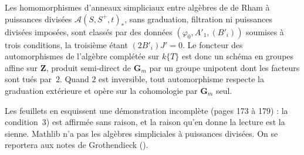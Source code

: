 \begin{encadre}
\begin{theoreme*}\nonverifie
Les homomorphismes d'anneaux simpliciaux entre algèbres de de Rham à puissances divisées $\mathcal A(S, S^+, t)_*$, sans graduation, filtration ni puissances divisées imposées, sont classés par des données $(\varphi_0, A'_1, (B'_i))$ soumises à trois conditions, la troisième étant $(2B'_i)J' = 0$. Le foncteur des automorphismes de l'algèbre complétée sur $k\{T\}$ est donc un schéma en groupes affine sur $\mathbf Z$, produit semi-direct de $\mathbf G_m$ par un groupe unipotent dont les facteurs sont tués par~$2$. Quand $2$ est inversible, tout automorphisme respecte la graduation extérieure et opère sur la cohomologie par $\mathbf G_m$ seul.
\end{theoreme*}
\end{encadre}
{\small Les feuillets en esquissent une démonstration incomplète (pages 173 à 179) : la condition~3) est affirmée sans raison, et la raison qu'en donne la lecture est la sienne. Mathlib n'a pas les algèbres simpliciales à puissances divisées. On se reportera aux notes de Grothendieck ().\par}

